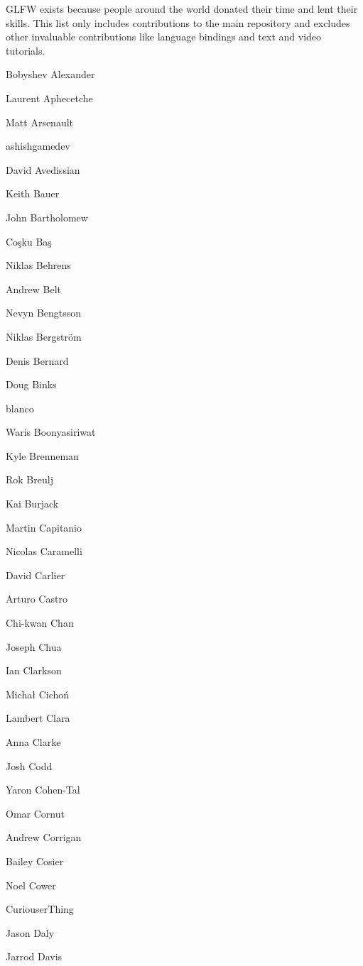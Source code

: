 G\+L\+FW exists because people around the world donated their time and lent their skills. This list only includes contributions to the main repository and excludes other invaluable contributions like language bindings and text and video tutorials.


\begin{DoxyItemize}
\item Bobyshev Alexander
\item Laurent Aphecetche
\item Matt Arsenault
\item ashishgamedev
\item David Avedissian
\item Keith Bauer
\item John Bartholomew
\item Coşku Baş
\item Niklas Behrens
\item Andrew Belt
\item Nevyn Bengtsson
\item Niklas Bergström
\item Denis Bernard
\item Doug Binks
\item blanco
\item Waris Boonyasiriwat
\item Kyle Brenneman
\item Rok Breulj
\item Kai Burjack
\item Martin Capitanio
\item Nicolas Caramelli
\item David Carlier
\item Arturo Castro
\item Chi-\/kwan Chan
\item Joseph Chua
\item Ian Clarkson
\item Michał Cichoń
\item Lambert Clara
\item Anna Clarke
\item Josh Codd
\item Yaron Cohen-\/\+Tal
\item Omar Cornut
\item Andrew Corrigan
\item Bailey Cosier
\item Noel Cower
\item Curiouser\+Thing
\item Jason Daly
\item Jarrod Davis

\end{DoxyItemize}
